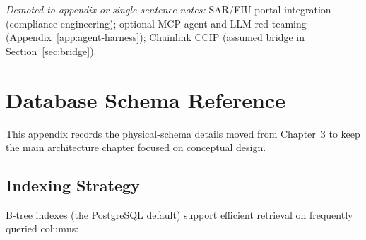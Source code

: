 \documentclass[12pt,a4paper]{report}
\begin{document}
\noindent\textit{Demoted to appendix or single-sentence notes:} SAR/FIU portal integration (compliance engineering); optional MCP agent and LLM red-teaming (Appendix~\ref{app:agent-harness}); Chainlink CCIP (assumed bridge in Section~\ref{sec:bridge}).


\appendix

\chapter{Database Schema Reference}
\label{app:db-schema-reference}

This appendix records the physical-schema details moved from Chapter~3 to keep the main architecture chapter focused on conceptual design.

\section{Indexing Strategy}

B-tree indexes (the PostgreSQL default) support efficient retrieval on frequently queried columns:
\end{document}
